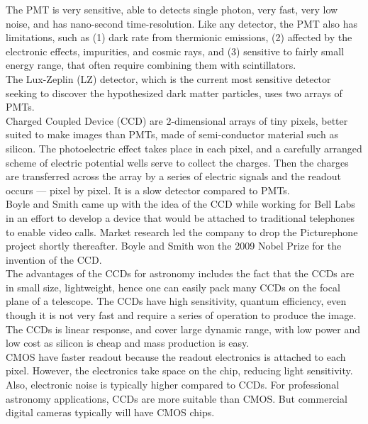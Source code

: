 \documentclass[11pt]{article}
\theoremstyle{break}
\theoremstyle{break}
\begin{document}
The PMT is very sensitive, able to detects single photon, very fast, very low noise, and has nano-second time-resolution. Like any detector, the PMT also has limitations, such as (1) dark rate from thermionic emissions, (2) affected by the electronic effects, impurities, and cosmic rays, and (3) sensitive to fairly small energy range, that often require combining them with scintillators. \\

The Lux-Zeplin (LZ) detector, which is the current most sensitive detector seeking to discover the hypothesized dark matter particles, uses two arrays of PMTs.\\

Charged Coupled Device (CCD) are $2$-dimensional arrays of tiny pixels, better suited to make images than PMTs, made of semi-conductor material such as silicon. The photoelectric effect takes place in each pixel, and a carefully arranged scheme of electric potential wells serve to collect the charges. Then the charges are transferred across the array by a series of electric signals and the readout occurs — pixel by pixel.  It is a slow detector compared to PMTs.  \\


Boyle and Smith came up with the idea of the CCD while working for Bell Labs in an effort to develop a device that would be attached to traditional telephones to enable video calls. Market research led the company to drop the Picturephone project shortly thereafter. Boyle and Smith won the 2009 Nobel Prize for the invention of the CCD.\\

The advantages of the CCDs for astronomy includes the fact that the CCDs are in small size, lightweight, hence one can easily pack many CCDs on the focal plane of a telescope. The CCDs have high sensitivity, quantum efficiency, even though it is not very fast and require a series of operation to produce the image. The CCDs is linear response, and cover large dynamic range, with low power and low cost as silicon is cheap and mass production is easy. \\

CMOS have faster readout because the readout electronics is attached to each pixel. However, the electronics take space on the chip, reducing light sensitivity. Also, electronic noise is typically higher compared to CCDs. For professional astronomy applications, CCDs are more suitable than CMOS. But commercial digital cameras typically will have CMOS chips.\\
\end{document}
